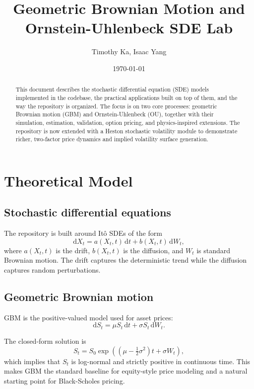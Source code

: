 \documentclass[11pt]{article}
\title{Geometric Brownian Motion and Ornstein-Uhlenbeck SDE Lab}
\author{Timothy Ka, Isaac Yang}
\date{\today}
\newcommand{\dd}{\mathrm{d}}
\begin{document}
\maketitle

\begin{abstract}
This document describes the stochastic differential equation (SDE) models implemented in the codebase, the practical applications built on top of them, and the way the repository is organized. The focus is on two core processes: geometric Brownian motion (GBM) and Ornstein-Uhlenbeck (OU), together with their simulation, estimation, validation, option pricing, and physics-inspired extensions. The repository is now extended with a Heston stochastic volatility module to demonstrate richer, two-factor price dynamics and implied volatility surface generation.
\end{abstract}

\tableofcontents
\newpage

\section{Theoretical Model}

\subsection{Stochastic differential equations}

The repository is built around It\^o SDEs of the form
\begin{equation}
  \dd X_t = a(X_t,t)\,\dd t + b(X_t,t)\,\dd W_t,
\end{equation}
where $a(X_t,t)$ is the drift, $b(X_t,t)$ is the diffusion, and $W_t$ is standard Brownian motion. The drift captures the deterministic trend while the diffusion captures random perturbations.

\subsection{Geometric Brownian motion}

GBM is the positive-valued model used for asset prices:
\begin{equation}
  \dd S_t = \mu S_t\,\dd t + \sigma S_t\,\dd W_t.
\end{equation}

The closed-form solution is
\begin{equation}
  S_t = S_0 \exp\left(\left(\mu - \tfrac{1}{2}\sigma^2\right)t + \sigma W_t\right),
\end{equation}
which implies that $S_t$ is log-normal and strictly positive in continuous time. This makes GBM the standard baseline for equity-style price modeling and a natural starting point for Black-Scholes pricing.
\end{document}
